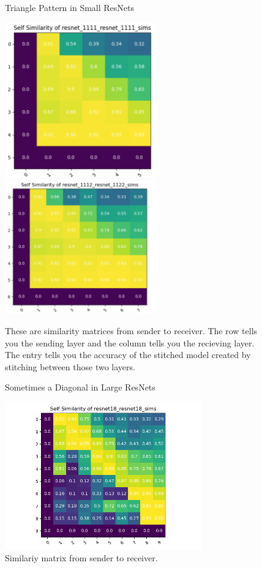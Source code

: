 \documentclass{article} %
\begin{document}
\label{Figure2}
\begin{center}
   \begin{figure}[h!]
      \centering
      \caption{Triangle Pattern in Small ResNets}
      \includegraphics[width=6.5cm]{resnet1111_1111.png}
      \includegraphics[width=6.5cm]{resnet1112_1122.png}
      \caption*{These are similarity matrices from sender to receiver. The row tells you the sending layer and the column tells you the recieving layer.
      The entry tells you the accuracy of the stitched model created by stitching between those two layers.}
   \end{figure}
\end{center}

\label{Figure3}
\begin{center}
   \begin{figure}[h!]
      \centering
      \caption{Sometimes a Diagonal in Large ResNets}
      \includegraphics[width=8.5cm]{resnet18_resnet18_sims.png}
      \caption*{Similariy matrix from sender to receiver.}
   \end{figure}
\end{center}
\end{document}
